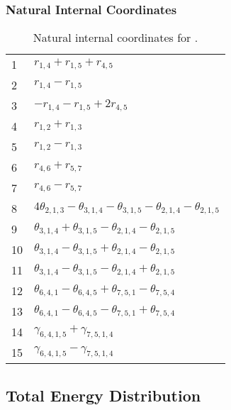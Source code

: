 \documentclass[10pt,oneside]{article}
\begin{document}
\begin{table}[h!]
\subsubsection*{Natural Internal Coordinates}
\centering
\caption{Natural internal coordinates for .}
\small
\begin{tabular}{ll}
\toprule
  1   & $r_{1,4} + r_{1,5} + r_{4,5}$ \\
  2   & $r_{1,4} - r_{1,5}$ \\
  3   & $-r_{1,4} - r_{1,5} + 2r_{4,5}$ \\
  4   & $r_{1,2} + r_{1,3}$ \\
  5   & $r_{1,2} - r_{1,3}$ \\
  6   & $r_{4,6} + r_{5,7}$ \\
  7   & $r_{4,6} - r_{5,7}$ \\
  8   & $4\theta_{2,1,3} - \theta_{3,1,4} - \theta_{3,1,5} - \theta_{2,1,4} - \theta_{2,1,5}$ \\
  9   & $\theta_{3,1,4} + \theta_{3,1,5} - \theta_{2,1,4} - \theta_{2,1,5}$ \\
  10  & $\theta_{3,1,4} - \theta_{3,1,5} + \theta_{2,1,4} - \theta_{2,1,5}$ \\
  11  & $\theta_{3,1,4} - \theta_{3,1,5} - \theta_{2,1,4} + \theta_{2,1,5}$ \\
  12  & $\theta_{6,4,1} - \theta_{6,4,5} + \theta_{7,5,1} - \theta_{7,5,4}$ \\
  13  & $\theta_{6,4,1} - \theta_{6,4,5} - \theta_{7,5,1} + \theta_{7,5,4}$ \\
  14  & $\gamma_{6,4,1,5} + \gamma_{7,5,1,4}$ \\
  15  & $\gamma_{6,4,1,5} - \gamma_{7,5,1,4}$ \\
\bottomrule
\end{tabular}
\end{table}

\begin{table}
\subsection*{Total Energy Distribution}
\centering\end{table}

\clearpage

\subsection{}
\end{document}
